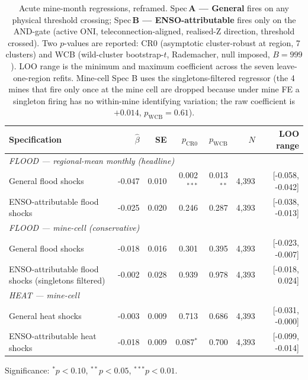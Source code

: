 \begin{table}[H]
\centering
\caption{Acute mine-month regressions, reframed. Spec\,\textbf{A — General} fires on any physical threshold crossing; Spec\,\textbf{B — ENSO-attributable} fires only on the AND-gate (active ONI, teleconnection-aligned, realised-Z direction, threshold crossed).  Two $p$-values are reported: CR0 (asymptotic cluster-robust at region, 7 clusters) and WCB (wild-cluster bootstrap-$t$, Rademacher, null imposed, $B=999$).  LOO range is the minimum and maximum coefficient across the seven leave-one-region refits.  Mine-cell Spec B uses the singletons-filtered regressor (the 4 mines that fire only once at the mine cell are dropped because under mine FE a singleton firing has no within-mine identifying variation; the raw coefficient is $+0.014$, $p_{\text{WCB}}=0.61$).}
\label{tab:acute-regressions}
\small
\begin{tabular}{p{6.0cm}rrrrrr}
\toprule
\textbf{Specification} & $\hat\beta$ & SE & $p_{\text{CR0}}$ & $p_{\text{WCB}}$ & $N$ & \textbf{LOO range} \\
\midrule
\multicolumn{7}{l}{\textit{FLOOD — regional-mean monthly (headline)}}\\
\quad General flood shocks & -0.047 & 0.010 & 0.002$^{***}$ & 0.013$^{**}$ & 4,393 & [-0.058, -0.042] \\
\quad ENSO-attributable flood shocks & -0.025 & 0.020 & 0.246 & 0.287 & 4,393 & [-0.038, -0.013] \\
\midrule
\multicolumn{7}{l}{\textit{FLOOD — mine-cell (conservative)}}\\
\quad General flood shocks & -0.018 & 0.016 & 0.301 & 0.395 & 4,393 & [-0.023, -0.007] \\
\quad ENSO-attributable flood shocks (singletons filtered) & -0.002 & 0.028 & 0.939 & 0.978 & 4,393 & [-0.018, 0.024] \\
\midrule
\multicolumn{7}{l}{\textit{HEAT — mine-cell}}\\
\quad General heat shocks & -0.003 & 0.009 & 0.713 & 0.686 & 4,393 & [-0.031, -0.000] \\
\quad ENSO-attributable heat shocks & -0.018 & 0.009 & 0.087$^{*}$ & 0.700 & 4,393 & [-0.099, -0.014] \\
\bottomrule
\end{tabular}
\begin{tablenotes}\small\item Significance: $^{*}p<0.10$, $^{**}p<0.05$, $^{***}p<0.01$.\end{tablenotes}
\end{table}
